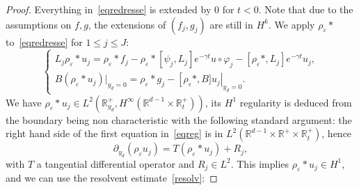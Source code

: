 \documentclass[10pt]{amsart}
\theoremstyle{definition}\newtheorem{defi}[theo]{Definition}\newtheorem{rema}[theo]{Remark}\newtheorem{exam}[theo]{Example}\newtheorem{exem}[theo]{Example}\newtheorem{nota}[theo]{Notation}
\newcommand{\R}{\mathbb{R}}
\begin{document}
\begin{proof}
Everything in~\eqref{eqredresse} is extended by $0$ for $t<0$. Note that due to the assumptions on $f,g$, the extensions of $(f_j,g_j)$ are still in $H^k$. We apply $\rho_\varepsilon*$ to~\eqref{eqredresse} for $1\leq j\leq J$:
\begin{equation}\label{eqreg}
\left\{
\begin{array}{ll}
L_j\rho_\varepsilon*u_j=\rho_\varepsilon*f_j-\rho_\varepsilon*\left[\psi_j,L_j\right]e^{-\gamma t}u\circ
\varphi_j-\left[\rho_\varepsilon*,L_j\right]e^{-\gamma t}u_j,\\
B\left(\rho_\varepsilon*u_j\right)|_{y_d=0}=\rho_\varepsilon*g_j -\left[\rho_\varepsilon*,B]u_j\right|_{y_d=0}.
\end{array}
\right.
\end{equation}
We have $\rho_\varepsilon*u_j\in L^2(\R^+_{y_d},H^\infty(\R^{d-1}\times \R_t^+))$, its $H^1$ regularity is deduced from the boundary being non characteristic with the following standard argument: the right hand side of the first equation in~\eqref{eqreg} is in $L^2(\R^{d-1}\times
\R^+\times \R_t^+)$, hence
\begin{equation}\label{characgain}
\partial_{y_d}(\rho_\varepsilon u_j)=T\left(\rho_\varepsilon* u_j\right)+R_j,
\end{equation}
with $T$ a tangential differential operator and $R_j\in L^2$. This implies $\rho_\varepsilon*u_j
\in H^1$, and we can use the resolvent estimate~\eqref{resolv}:



\end{proof}
\end{document}

